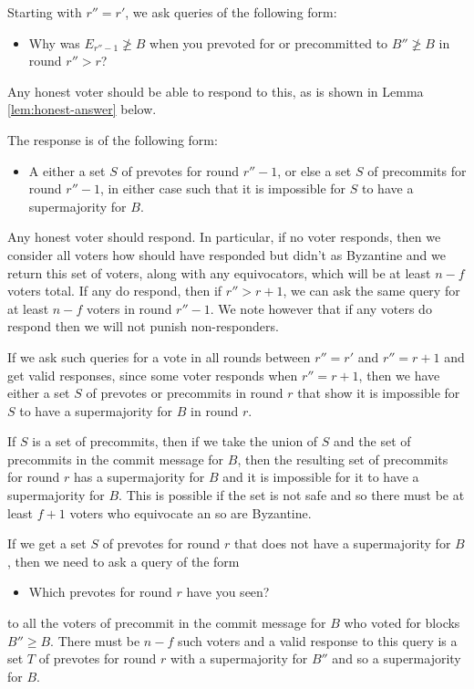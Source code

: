 \documentclass{article}
\begin{document}
Starting with $r''=r' $, we ask queries of the following form: 
\begin{itemize}
\item Why was $E_{r''-1} \not\geq B$  when you prevoted for or precommitted to $B'' \not\geq B$ in round $r'' > r$?
\end{itemize}
\noindent Any honest voter should be able to respond to this, as is shown in Lemma \ref{lem:honest-answer} below. 

The response is of the following form:
\begin{itemize}
\item A either a set $S$ of prevotes for round $r''-1$, or else a set $S$ of precommits for round $r''-1$, in either case such that it is impossible for $S$ to have a supermajority for $B$.
\end{itemize}

Any honest voter should respond.  In particular, if no voter responds, then we consider all  voters how should have responded but didn't as Byzantine and we return this set of voters, along with any equivocators, which will be at least $n-f$ voters total. If any do respond, then if $r'' > r+1$, we can ask the same query for at least $n-f$ voters in round $r''-1$. We note however that if any voters do respond then we will not punish non-responders.

If we ask such queries for a vote in all rounds between $r''=r'$ and $r''=r+1$ and get valid responses, since some voter responds when $r''=r+1$, then we have either a set $S$ of prevotes or precommits in round $r$ that show it is impossible for $S$ to have a supermajority for $B$ in round $r$.

If $S$ is a set of precommits, then if we take the union of $S$ and the set of precommits in the commit message for $B$, then the resulting set of precommits for round $r$ has a supermajority for $B$ and it is impossible for it to have a supermajority for $B$. This is possible if the set is not safe and so there must be at least $f+1$ voters who equivocate an so are Byzantine.

If we get a set $S$ of prevotes for round $r$ that does not have a supermajority for $B$, then we need to ask a query of the form

\begin{itemize}
\item Which prevotes for round $r$ have you seen?
\end{itemize}
\noindent to all the voters of precommit in the commit message for $B$  who voted for blocks $B'' \geq B$. There must be $n-f$ such voters and a valid response to this query is a set $T$ of prevotes for round $r$ with a supermajority for $B''$ and so a supermajority for $B$.
\end{document}
